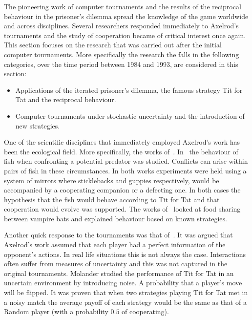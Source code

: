 \documentclass{article}
\theoremstyle{definition}
\begin{document}
The pioneering work of computer tournaments and the results of the reciprocal behaviour
in the prisoner's dilemma spread the knowledge of the game worldwide and across
disciplines. Several researchers responded immediately to Axelrod's tournaments
and the study of cooperation became of critical interest once again.
This section focuses on the research that was carried out after the initial
computer tournaments. More specifically the research the falls in the following
categories, over the time period between 1984 and 1993, are considered in this section:

\begin{itemize}
    \item Applications of the iterated prisoner's dilemma, the famous strategy
    Tit for Tat and the reciprocal behaviour.
    \item Computer tournaments under stochastic uncertainty and the introduction
    of new strategies.
\end{itemize}

One of the scientific disciplines that immediately employed Axelrod's work has
been the ecological field. More specifically, the works of~\cite{Craig1984,
Dugatkin1988, Godfray1992, Milinski1987, Wilkinson1984}.
In~\cite{Dugatkin1988, Milinski1987} the behaviour of fish when confronting a
potential predator was studied. Conflicts can arise within pairs of fish in these
circumstances. In both works experiments were held using a system of mirrors
where sticklebacks and guppies respectively, would be accompanied by a cooperating
companion or a defecting one. In both cases the hypothesis that the fish would
behave according to Tit for Tat and that cooperation would evolve was supported.
The works of~\cite{Godfray1992, Wilkinson1984} looked at food sharing between
vampire bats and explained behaviour based on known strategies.

Another quick response to the tournaments was that of~\cite{Molander1985}.
It was argued that Axelrod's work assumed that each player had a perfect
information of the opponent's actions. In real life situations this is not always
the case. Interactions often suffer from measures of uncertainty and this was not
captured in the original tournaments. Molander studied the performance of Tit for
Tat in an uncertain environment by introducing noise. A probability that a player's
move will be flipped. It was proven that when two strategies playing Tit for Tat
met in a noisy match the average payoff of each strategy would be the same as
that of a Random player (with a probability \(0.5\) of cooperating).
\end{document}
